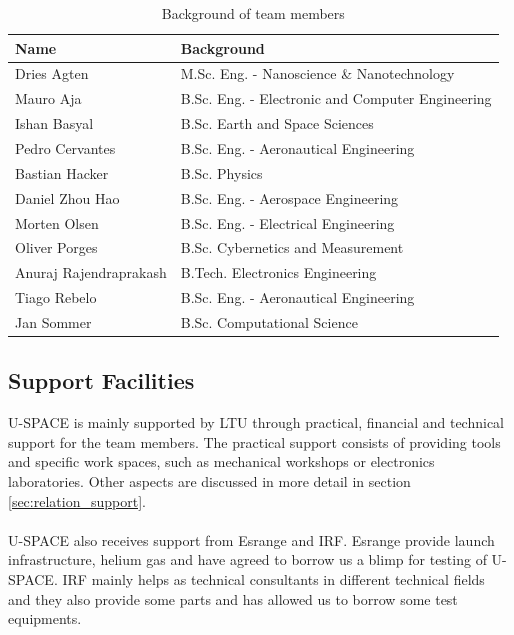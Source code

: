 \begin{table}[h]
\centering
\caption{Background of team members}
\begin{tabular}{l l}
\hline
\textbf{Name} & \textbf{Background} \\
\hline
Dries Agten & M.Sc. Eng. - Nanoscience \& Nanotechnology \\
Mauro Aja & B.Sc. Eng. - Electronic and Computer Engineering \\
Ishan Basyal & B.Sc. Earth and Space Sciences  \\
Pedro Cervantes & B.Sc. Eng. - Aeronautical Engineering \\
Bastian Hacker & B.Sc. Physics\\
Daniel Zhou Hao & B.Sc. Eng. - Aerospace Engineering\\
Morten Olsen & B.Sc. Eng. - Electrical Engineering \\
Oliver Porges & B.Sc. Cybernetics and Measurement  \\
Anuraj Rajendraprakash & B.Tech. Electronics Engineering \\
Tiago Rebelo & B.Sc. Eng. - Aeronautical Engineering \\
Jan Sommer & B.Sc. Computational Science \\
\hline
\end{tabular}
\label{tab:backgrounds}
\end{table}
%
\subsection{Support Facilities}
%
\ac{U-SPACE} is mainly supported by \ac{LTU} through practical, financial and technical support for the team members. The practical support consists of providing tools and specific work spaces, such as mechanical workshops or electronics laboratories. Other aspects are discussed in more detail in section \ref{sec:relation_support}.
\\
\\
\ac{U-SPACE} also receives support from Esrange and \ac{IRF}. Esrange provide launch infrastructure, helium gas and have agreed to borrow us a blimp for testing of U-SPACE. \ac{IRF} mainly helps as technical consultants in different technical fields and they also provide some parts and has allowed us to borrow some test equipments.


%
